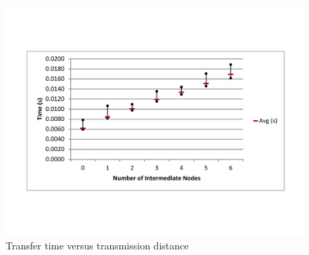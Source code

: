 \begin{figure}[ptb]
	\begin{centering}
		\includegraphics[width=6in]{Protocol/Figures/protocol-time_vs_distance.pdf}
		\caption{Transfer time versus transmission distance}
		\label{fig:protocol:time_vs_distance}
	\end{centering}
\end{figure}


